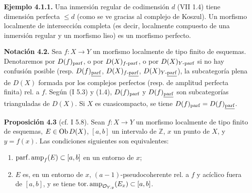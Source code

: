 \textbf{Ejemplo 4.1.1.} Una inmersión regular de codimensión \(d\) (VII 1.4) tiene dimensión perfecta \(\leq d\) (como se ve gracias al complejo de Koszul). Un morfismo localmente de intersección completa (es decir, localmente compuesto de una inmersión regular y un morfismo liso) es un morfismo perfecto.

\textbf{Notación 4.2.} Sea \(f:X\to Y\) un morfismo localmente de tipo finito de esquemas. Denotaremos por \(D(f)_{\mathrm{parf}}\), o por \(D(X)_{f\text{-}\mathrm{parf}}\), o por \(D(X)_{Y\text{-}\mathrm{parf}}\) si no hay confusión posible (resp. \(D(f)_{\uparf}\), \(D(X)_{f\text{-}\uparf}\), \(D(X)_{Y\text{-}\uparf}\)), la subcategoría plena de \(D(X)\) formada por los complejos perfectos (resp. de amplitud perfecta finita) rel. a \(f\). Según (I 5.3) y (1.4), \(D(f)_{\mathrm{parf}}\) y \(D(f)_{\uparf}\) son subcategorías trianguladas de \(D(X)\). Si \(X\) es cuasicompacto, se tiene \(D(f)_{\parf}=D(f)_{\uparf}\).

\textbf{Proposición 4.3} (cf. I 5.8). Sean \(f:X\to Y\) un morfismo localmente de tipo finito de esquemas, \(E\in\operatorname{Ob} D(X)\), \([a,b]\) un intervalo de \(\mathbb Z\), \(x\) un punto de \(X\), y \(y=f(x)\). Las condiciones siguientes son equivalentes:
\begin{enumerate}[label=(\roman*)]
\item \(\operatorname{parf.amp}_f(E)\subset[a,b]\) en un entorno de \(x\);
\item \(E\) es, en un entorno de \(x\), \((a-1)\)-pseudocoherente rel. a \(f\) y acíclico fuera de \([a,b]\), y se tiene \(\operatorname{tor.amp}_{\mathcal O_{Y,y}}(E_x)\subset[a,b]\).
\end{enumerate}


